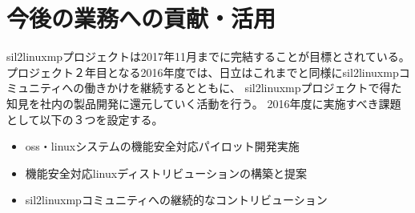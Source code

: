 \chapter{今後の業務への貢献・活用}
\acrshort{sil2linuxmp}プロジェクトは2017年11月までに完結することが目標とされている。
プロジェクト２年目となる2016年度では、日立はこれまでと同様に\acrshort{sil2linuxmp}コミュニティへの働きかけを継続するとともに、
\acrshort{sil2linuxmp}プロジェクトで得た知見を社内の製品開発に還元していく活動を行う。
2016年度に実施すべき課題として以下の３つを設定する。
\begin{itemize}
  \item \acrshort{oss}・\acrshort{linux}システムの機能安全対応パイロット開発実施
  \item 機能安全対応\acrshort{linux}ディストリビューションの構築と提案
  \item \acrshort{sil2linuxmp}コミュニティへの継続的なコントリビューション
\end{itemize}
